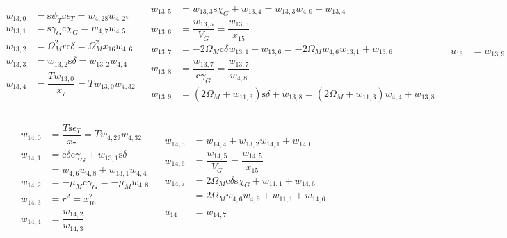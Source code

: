 \begin{align} \label{eq:auxF13}
\begin{split}
w_{13,0} &= \text{s}\psi_{T} \text{c}\epsilon_{T} = w_{4,28}w_{4,27} \\
w_{13,1} &= \text{s}\gamma_{G} \text{c}\chi_{G} = w_{4,7}w_{4,5} \\
w_{13,2} &= \Omega_{M}^{2} r \text{c}\delta = \Omega_{M}^{2} x_{16} w_{4,6} \\
w_{13,3} &= w_{13,2} \text{s}\delta = w_{13,2}w_{4,4} \\
w_{13,4} &= \dfrac{T w_{13,0}}{x_{7}} = T w_{13,0} w_{4,32} \\
\end{split}
&
\begin{split}
w_{13,5} &= w_{13,3} \text{s}\chi_{G}+w_{13,4} = w_{13,3}w_{4,9}+w_{13,4} \\
w_{13,6} &= \dfrac{w_{13,5}}{V_{G}} = \dfrac{w_{13,5}}{x_{15}} \\
w_{13,7} &= -2\Omega_{M} \text{c}\delta w_{13,1}+w_{13,6} = -2\Omega_{M}w_{4,6}w_{13,1}+w_{13,6} \\
w_{13,8} &= \dfrac{w_{13,7}}{\text{c}\gamma_{G}} = \dfrac{w_{13,7}}{w_{4,8}} \\
w_{13,9} &= \left(2\Omega_{M}+w_{11,3} \right) \text{s}\delta+w_{13,8} = \left(2\Omega_{M}+w_{11,3} \right)w_{4,4}+w_{13,8} \\
\end{split}
&
\begin{split}
u_{13} &= w_{13,9} \\
\end{split}
\end{align}

\begin{align} \label{eq:auxF14}
\begin{split}
w_{14,0} &= \dfrac{T \text{s}\epsilon_{T}}{x_{7}} = T w_{4,29}w_{4,32} \\
w_{14,1} &= \text{c}\delta \text{c}\gamma_{G}+w_{13,1} \text{s}\delta \\
&= w_{4,6}w_{4,8}+w_{13,1}w_{4,4} \\
w_{14,2} &= -\mu_{M} \text{c}\gamma_{G} = -\mu_{M}w_{4,8} \\
w_{14,3} &= r^{2} = x_{16}^{2} \\
w_{14,4} &= \dfrac{w_{14,2}}{w_{14,3}} \\
\end{split}
&
\begin{split}
w_{14,5} &= w_{14,4}+w_{13,2}w_{14,1}+w_{14,0} \\
w_{14,6} &= \dfrac{w_{14,5}}{V_{G}} = \dfrac{w_{14,5}}{x_{15}} \\
w_{14,7} &= 2\Omega_{M}\text{c}\delta \text{s}\chi_{G}+w_{11,1}+w_{14,6} \\
&= 2\Omega_{M}w_{4,6}w_{4,9}+w_{11,1}+w_{14,6} \\
\\
u_{14} &= w_{14,7} \\
\end{split}
\end{align}

